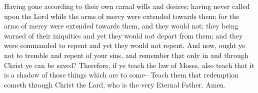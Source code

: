 Having gone according to their own carnal wills and desires; having never called upon the Lord while the arms of mercy were extended towards them; for the arms of mercy were extended towards them, and they would not; they being warned of their iniquities and yet they would not depart from them; and they were commanded to repent and yet they would not repent.
\bverse \iffalse And now, ought ye not to tremble and repent of your sins, and remember that only in and through Christ ye can be saved? \fi
And now, ought ye not to tremble and repent of your sins, and remember that only in and through Christ ye can be saved?
\bverse \iffalse Therefore, if ye teach the law of Moses, also teach that it is a shadow of those things which are to come-- \fi
Therefore, if ye teach the law of Moses, also teach that it is a shadow of those things which are to come--
\bverse \iffalse Teach them that redemption cometh through Christ the Lord, who is the very Eternal Father. Amen. \fi
Teach them that redemption cometh through Christ the Lord, who is the very Eternal Father. Amen.

